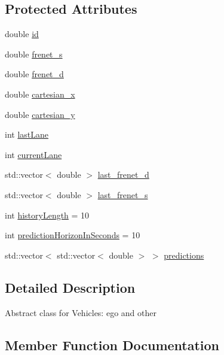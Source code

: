 \subsection*{Protected Attributes}
\begin{DoxyCompactItemize}
\item 
double \hyperlink{classAbstractVehicle_ae714379f009c459ec3b3856140204c8e}{id}
\item 
double \hyperlink{classAbstractVehicle_a8fe56b85f2acffbbb5e451b99f4883b4}{frenet\+\_\+s}
\item 
double \hyperlink{classAbstractVehicle_a6a98d1a83288b4c7c7d70b09f606e648}{frenet\+\_\+d}
\item 
double \hyperlink{classAbstractVehicle_a4e60d7e6e2d55940227bd6e31e3bb5a6}{cartesian\+\_\+x}
\item 
double \hyperlink{classAbstractVehicle_a16bb1778276fb773f1bfa0fbb855eb6d}{cartesian\+\_\+y}
\item 
int \hyperlink{classAbstractVehicle_adb32774724d498cfcdf2309e0a189b6e}{last\+Lane}
\item 
int \hyperlink{classAbstractVehicle_aa0a52d60f51e34c045db63ecc4a96f98}{current\+Lane}
\item 
std\+::vector$<$ double $>$ \hyperlink{classAbstractVehicle_ac9370b8bc9863b02dbc17f0d3429ce2d}{last\+\_\+frenet\+\_\+d}
\item 
std\+::vector$<$ double $>$ \hyperlink{classAbstractVehicle_a087956b0de86efa9434da992fdb2d27d}{last\+\_\+frenet\+\_\+s}
\item 
int \hyperlink{classAbstractVehicle_a5cf60337402a5d6457229e186a403dc5}{history\+Length} = 10
\item 
int \hyperlink{classAbstractVehicle_ae24b37395a3fa832a82b6460a127378b}{prediction\+Horizon\+In\+Seconds} = 10
\item 
std\+::vector$<$ std\+::vector$<$ double $>$ $>$ \hyperlink{classAbstractVehicle_a72ef849b0da369f2eb74ca091b1e00b7}{predictions}
\end{DoxyCompactItemize}


\subsection{Detailed Description}
Abstract class for Vehicles\+: ego and other 

\subsection{Member Function Documentation}

